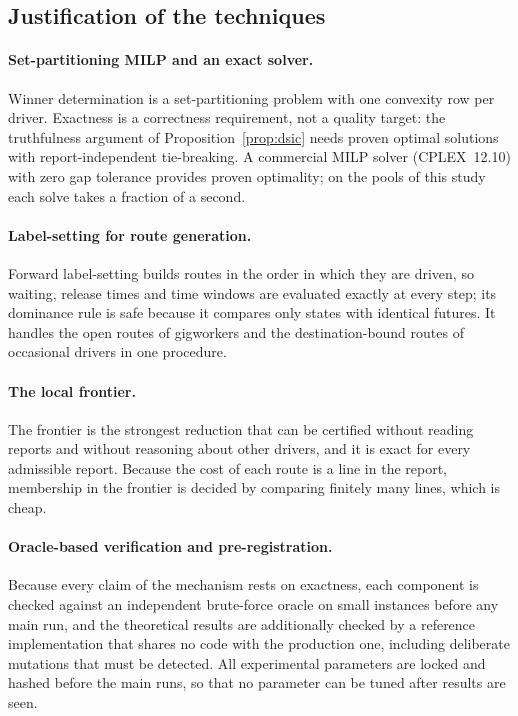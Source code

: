 \subsection{Justification of the techniques}

\paragraph{Set-partitioning MILP and an exact solver.} Winner
determination is a set-partitioning problem with one convexity row per
driver. Exactness is a correctness requirement, not a quality target:
the truthfulness argument of Proposition~\ref{prop:dsic} needs proven
optimal solutions with report-independent tie-breaking. A commercial MILP
solver (CPLEX~12.10) with zero gap tolerance provides proven optimality; on
the pools of this study each solve takes a fraction of a second.

\paragraph{Label-setting for route generation.} Forward label-setting
builds routes in the order in which they are driven, so waiting, release
times and time windows are evaluated exactly at every step; its dominance
rule is safe because it compares only states with identical futures. It
handles the open routes of gigworkers and the destination-bound routes of
occasional drivers in one procedure.

\paragraph{The local frontier.} The frontier is the strongest reduction
that can be certified without reading reports and without reasoning about
other drivers, and it is exact for every admissible report. Because the
cost of each route is a line in the report, membership in the frontier is
decided by comparing finitely many lines, which is cheap.

\paragraph{Oracle-based verification and pre-registration.} Because every
claim of the mechanism rests on exactness, each component is checked against
an independent brute-force oracle on small instances before any main run,
and the theoretical results are additionally checked by a reference
implementation that shares no code with the production one, including
deliberate mutations that must be detected. All experimental parameters are
locked and hashed before the main runs, so that no parameter can be tuned
after results are seen.
